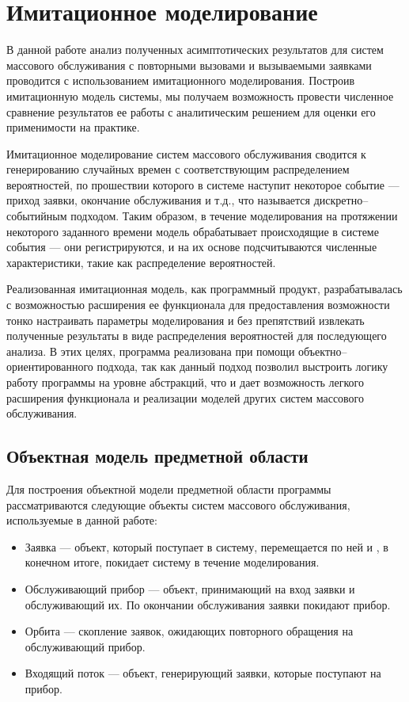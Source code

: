 \section{Имитационное моделирование}
В данной работе анализ полученных асимптотических результатов для систем массового обслуживания с повторными вызовами и вызываемыми заявками проводится с использованием имитационного моделирования. Построив имитационную модель системы, мы получаем возможность провести численное сравнение результатов ее работы с аналитическим решением для оценки его применимости на практике.

Имитационное моделирование систем массового обслуживания \cite{wieland2003queueing} сводится к генерированию случайных времен с соответствующим распределением вероятностей, по прошествии которого в системе наступит некоторое событие --- приход заявки, окончание обслуживания и т.д., что называется дискретно--событийным подходом. Таким образом, в течение моделирования на протяжении некоторого заданного времени модель обрабатывает происходящие в системе события --- они регистрируются, и на их основе подсчитываются численные характеристики, такие как распределение вероятностей.

Реализованная имитационная модель, как программный продукт, разрабатывалась с возможностью расширения ее функционала для предоставления возможности тонко настраивать параметры моделирования и без препятствий извлекать полученные результаты в виде распределения вероятностей для последующего анализа. В этих целях, программа реализована при помощи объектно--ориентированного подхода, так как данный подход позволил выстроить логику работу программы на уровне абстракций, что и дает возможность легкого расширения функционала и реализации моделей других систем массового обслуживания.

\subsection {Объектная модель предметной области}
Для построения объектной модели предметной области программы рассматриваются следующие объекты систем массового обслуживания, используемые в данной работе:
\begin{itemize}
\item Заявка --- объект, который поступает в систему, перемещается по ней и , в конечном итоге, покидает систему в течение моделирования.
\item Обслуживающий прибор --- объект, принимающий на вход заявки и обслуживающий их. По окончании обслуживания заявки покидают прибор.
\item Орбита --- скопление заявок, ожидающих повторного обращения на обслуживающий прибор.
\item Входящий поток --- объект, генерирующий заявки, которые поступают на прибор.
	\end{itemize}

